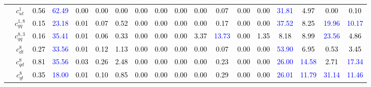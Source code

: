 \documentclass{article}
\begin{document}
\begin{landscape}
\begin{table}[H]
\begin{tabular}{|c|c|c|c|c|c|c|c|c|c|c|c|c|c|c|c|c|c|}
 & $c_{ut}^{1}$ & \textcolor{black}{0.56} & \textcolor{blue}{62.49} & \textcolor{black}{0.00} & \textcolor{black}{0.00} & \textcolor{black}{0.00} & \textcolor{black}{0.00} & \textcolor{black}{0.00} & \textcolor{black}{0.00} & \textcolor{black}{0.00} & \textcolor{black}{0.07} & \textcolor{black}{0.00} & \textcolor{black}{0.00} & \textcolor{blue}{31.81} & \textcolor{black}{4.97} & \textcolor{black}{0.00} & \textcolor{black}{0.10}\\ \cline{2-18}
 & $c_{qq}^{1,8}$ & \textcolor{black}{0.15} & \textcolor{blue}{23.18} & \textcolor{black}{0.01} & \textcolor{black}{0.07} & \textcolor{black}{0.52} & \textcolor{black}{0.00} & \textcolor{black}{0.00} & \textcolor{black}{0.00} & \textcolor{black}{0.00} & \textcolor{black}{0.17} & \textcolor{black}{0.00} & \textcolor{black}{0.00} & \textcolor{blue}{37.52} & \textcolor{black}{8.25} & \textcolor{blue}{19.96} & \textcolor{blue}{10.17}\\ \cline{2-18}
 & $c_{qq}^{8,3}$ & \textcolor{black}{0.16} & \textcolor{blue}{35.41} & \textcolor{black}{0.01} & \textcolor{black}{0.06} & \textcolor{black}{0.33} & \textcolor{black}{0.00} & \textcolor{black}{0.00} & \textcolor{black}{0.00} & \textcolor{black}{3.37} & \textcolor{blue}{13.73} & \textcolor{black}{0.00} & \textcolor{black}{1.35} & \textcolor{black}{8.18} & \textcolor{black}{8.99} & \textcolor{blue}{23.56} & \textcolor{black}{4.86}\\ \cline{2-18}
 & $c_{dt}^{8}$ & \textcolor{black}{0.27} & \textcolor{blue}{33.56} & \textcolor{black}{0.01} & \textcolor{black}{0.12} & \textcolor{black}{1.13} & \textcolor{black}{0.00} & \textcolor{black}{0.00} & \textcolor{black}{0.00} & \textcolor{black}{0.00} & \textcolor{black}{0.07} & \textcolor{black}{0.00} & \textcolor{black}{0.00} & \textcolor{blue}{53.90} & \textcolor{black}{6.95} & \textcolor{black}{0.53} & \textcolor{black}{3.45}\\ \cline{2-18}
 & $c_{qd}^{8}$ & \textcolor{black}{0.81} & \textcolor{blue}{35.56} & \textcolor{black}{0.03} & \textcolor{black}{0.26} & \textcolor{black}{2.48} & \textcolor{black}{0.00} & \textcolor{black}{0.00} & \textcolor{black}{0.00} & \textcolor{black}{0.00} & \textcolor{black}{0.23} & \textcolor{black}{0.00} & \textcolor{black}{0.00} & \textcolor{blue}{26.00} & \textcolor{blue}{14.58} & \textcolor{black}{2.71} & \textcolor{blue}{17.34}\\ \cline{2-18}
 & $c_{qt}^{8}$ & \textcolor{black}{0.35} & \textcolor{blue}{18.00} & \textcolor{black}{0.01} & \textcolor{black}{0.10} & \textcolor{black}{0.85} & \textcolor{black}{0.00} & \textcolor{black}{0.00} & \textcolor{black}{0.00} & \textcolor{black}{0.00} & \textcolor{black}{0.29} & \textcolor{black}{0.00} & \textcolor{black}{0.00} & \textcolor{blue}{26.01} & \textcolor{blue}{11.79} & \textcolor{blue}{31.14} & \textcolor{blue}{11.46}\\ \cline{2-18}

\end{tabular}
\end{table}
\end{landscape}
\end{document}
